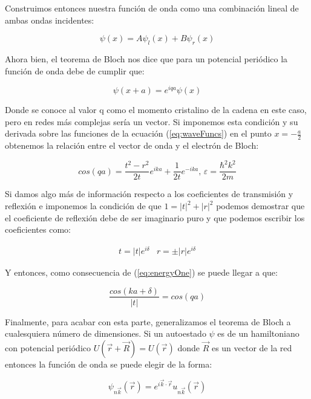 \documentclass{article} %
\begin{document}
Construimos entonces nuestra función de onda como una combinación lineal de ambas ondas incidentes:

\begin{equation}
\psi(x) = A\psi_l(x) + B\psi_r(x)
\end{equation}

Ahora bien, el teorema de Bloch nos dice que para un potencial periódico la función de onda debe de cumplir que:

\begin{equation}
\psi(x+a)=e^{iqa}\psi(x)
\end{equation}

Donde se conoce al valor q como el momento cristalino de la cadena en este caso, pero en redes más complejas sería un vector. Si imponemos esta condición y su derivada sobre las funciones de la ecuación (\ref{eq:waveFuncs}) en el punto $x = -\frac{a}{2}$ obtenemos la relación entre el vector de onda y el electrón de Bloch:

\begin{equation}
cos (qa) = \frac{t^2 - r^2}{2t}e^{ika} + \frac{1}{2t}e^{-ika}, \, \varepsilon=\frac{\hbar^2k^2}{2m}
\label{eq:energyOne}
\end{equation}

Si damos algo más de información respecto a los coeficientes de transmisión y reflexión e imponemos la condición de que $1 = |t|^2 + |r|^2$ podemos demostrar que el coeficiente de reflexión debe de ser imaginario puro y que podemos escribir los coeficientes como:

\begin{equation}
\begin{array}{cc}
t = |t|e^{i\delta} & r = \pm |r|e^{i\delta}
\end{array}
\end{equation}

Y entonces, como consecuencia de (\ref{eq:energyOne}) se puede llegar a que:

\begin{equation}
\frac{cos(ka + \delta)}{|t|} = cos(qa)
\label{eq:energyCoefs}
\end{equation}

Finalmente, para acabar con esta parte, generalizamos el teorema de Bloch a cualesquiera número de dimensiones. Si un autoestado $\psi$ es de un hamiltoniano con potencial periódico $U(\vec{r}+\vec{R}) = U(\vec{r})$ donde $\vec{R}$ es un vector de la red entonces la función de onda se puede elegir de la forma:

\begin{equation}
\psi_{n\vec{k}}(\vec{r}) = e^{i\vec{k}\cdot\vec{r}}u_{n\vec{k}}(\vec{r})
\end{equation}
\end{document}
